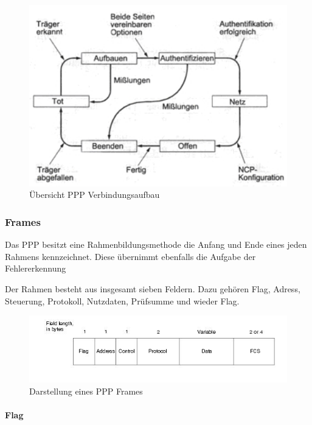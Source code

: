 \documentclass[12pt, a4paper, ngerman]{article}
\begin{document}
\begin{figure}[H]
	\centering
	\includegraphics[width=1\textwidth]{Grafiken/ppp.jpg}	
	\caption{Übersicht PPP Verbindungsaufbau \cite{*}}
	\label{aufbau_ppp-verbindung}
\end{figure}


\subsubsection{Frames}

Das PPP besitzt eine Rahmenbildungsmethode die Anfang und Ende eines jeden Rahmens kennzeichnet. Diese übernimmt ebenfalls die Aufgabe der Fehlererkennung

Der Rahmen besteht aus insgesamt sieben Feldern. Dazu gehören Flag, Adress, Steuerung,  Protokoll, Nutzdaten, Prüfsumme und wieder Flag.

\begin{figure}[H]
	\centering
	\includegraphics[width=1\textwidth]{Grafiken/ppp-frame.jpg}	
	\caption{Darstellung eines PPP Frames \cite{*}}
	\label{ppp_frame}
\end{figure}

\paragraph{Flag}
\end{document}
